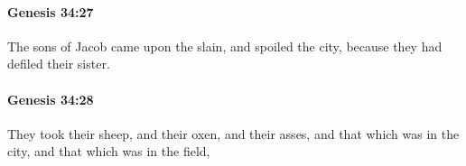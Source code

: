 		\paragraph{Genesis 34:27} %
			\label{GENESIS-34-27}

			The sons of Jacob came upon the slain, and spoiled the city, because they had defiled their sister.


		\paragraph{Genesis 34:28} %
			\label{GENESIS-34-28}

			They took their sheep, and their oxen, and their asses, and that which was in the city, and that which was in the field,



